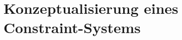 \section{Konzeptualisierung eines Constraint-Systems}\label{section:Konzeptualisierung eines Constraint-Systems}